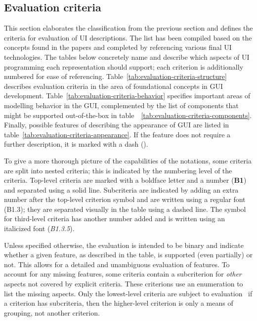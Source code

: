 \subsection{Evaluation criteria}\label{subsec:evaluation-criteria}

This section elaborates the classification from the previous section and defines the criteria for evaluation of UI descriptions.
The list has been compiled based on the concepts found in the papers and completed by referencing various final UI technologies.
The tables below concretely name and describe which aspects of UI programming each representation should support;
each criterion is additionally numbered for ease of referencing.
Table~\ref{tab:evaluation-criteria-structure} describes evaluation criteria in the area of foundational concepts in GUI development.
Table~\ref{tab:evaluation-criteria-behavior} specifies important areas of modelling behavior in the GUI, complemented by the list of components that might be supported out-of-the-box in table~~\ref{tab:evaluation-criteria-components}.
Finally, possible features of describing the appearance of GUI are listed in table~\ref{tab:evaluation-criteria-appearance}.
If the feature does not require a further description, it is marked with a dash (\textemdash).

To give a more thorough picture of the capabilities of the notations, some criteria are split into nested criteria;
this is indicated by the numbering level of the criteria.
Top-level criteria are marked with a boldface letter and a number (\textbf{B1}) and separated using a solid line.
Subcriteria are indicated by adding an extra number after the top-level criterion symbol and are written using a regular font (B1.3);
they are separated visually in the table using a dashed line.
The symbol for third-level criteria has another number added and is written using an italicized font (\textit{B1.3.5}).

Unless specified otherwise, the evaluation is intended to be binary and indicate whether a given feature, as described in the table, is supported (even partially) or not.
This allows for a detailed and unambiguous evaluation of features.
To account for any missing features, some criteria contain a subcriterion for \emph{other} aspects not covered by explicit criteria.
These criterions use an enumeration to list the missing aspects.
Only the lowest-level criteria are subject to evaluation \textendash\ if a criterion has subcriteria, then the higher-level criterion is only a means of grouping, not another criterion.


